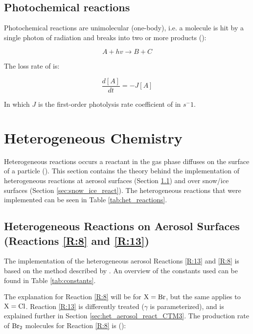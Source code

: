 \subsection{Photochemical reactions}\label{sec:pchem_reactions}

Photochemical reactions are unimolecular (one-body), i.e. a molecule is hit by a single photon of radiation and breaks into two or more products (\cite{AtmModFund}):

\begin{equation*}
    A + hv \rightarrow B + C
\end{equation*}

The loss rate of  is: 

\begin{equation*}
    \frac{d[A]}{dt} = -J[A]
\end{equation*}

In which $J$ is the first-order photolysis rate coefficient of  in $s^-1$. 


\section{Heterogeneous Chemistry}\label{sec:het_chem}

Heterogeneous reactions occurs a reactant in the gas phase diffuses on the surface of a particle (\cite{DAVIES2018}). This section contains the theory behind the implementation of heterogeneous reactions at aerosol surfaces (Section \ref{sec:aerosol_react}) and over snow/ice surfaces (Section \ref{sec:snow_ice_react}). The heterogeneous reactions that were implemented can be seen in Table \ref{tab:het_reactions}. 



\subsection{Heterogeneous Reactions on Aerosol Surfaces (Reactions \ref{R:8} and \ref{R:13})}\label{sec:aerosol_react}

The implementation of the heterogeneous aerosol Reactions \ref{R:13} and \ref{R:8} is based on the method described by \cite{CAO}. An overview of the constants used can be found in Table \ref{tab:constants}.

\medskip

The explanation for Reaction \ref{R:8} will be for $\mathrm{X} = \mathrm{Br}$, but the same applies to $\mathrm{X} = \mathrm{Cl}$. Reaction \ref{R:13} is differently treated ($\gamma$ is parameterized), and is explained further in Section \ref{sec:het_aerosol_react_CTM3}. The production rate of $\mathrm{Br_2}$ molecules for Reaction \ref{R:8} is (\cite{schwartz1986}): 

